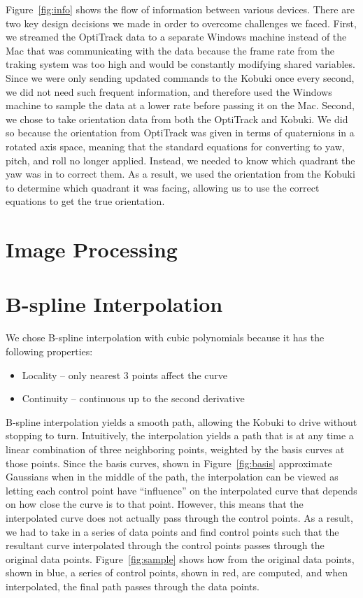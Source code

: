 \documentclass[10pt]{article}
\begin{document}
\begin{multicols}{2}
  Figure~\ref{fig:info} shows the flow of information between various devices.
  There are two key design decisions we made in order to overcome challenges we
  faced. First, we streamed the OptiTrack data to a separate Windows machine
  instead of the Mac that was communicating with the data because the frame rate
  from the traking system was too high and would be constantly modifying shared
  variables. Since we were only sending updated commands to the Kobuki once
  every second, we did not need such frequent information, and therefore used
  the Windows machine to sample the data at a lower rate before passing it on
  the Mac. Second, we chose to take orientation data from both the OptiTrack and
  Kobuki. We did so because the orientation from OptiTrack was given in terms of
  quaternions in a rotated axis space, meaning that the standard equations for
  converting to yaw, pitch, and roll no longer applied. Instead, we needed to
  know which quadrant the yaw was in to correct them. As a result, we used the
  orientation from the Kobuki to determine which quadrant it was facing,
  allowing us to use the correct equations to get the true orientation.

  \section*{Image Processing}

  \section*{B-spline Interpolation}
  We chose B-spline interpolation with cubic polynomials because it has the
  following properties: \cite{fuhuacheng2012}
  \begin{itemize}
    \item Locality -- only nearest 3 points affect the curve
    \item Continuity -- continuous up to the second derivative
  \end{itemize}
  B-spline interpolation yields a smooth path, allowing the Kobuki to drive
  without stopping to turn. Intuitively, the interpolation yields a path that is
  at any time a linear combination of three neighboring points, weighted by the
  basis curves at those points. Since the basis curves, shown in
  Figure~\ref{fig:basis} approximate Gaussians when in the middle of the path,
  the interpolation can be viewed as letting each control point have
  ``influence'' on the interpolated curve that depends on how close the curve is
  to that point. However, this means that the interpolated curve does not
  actually pass through the control points. As a result, we had to take in a
  series of data points and find control points such that the resultant curve
  interpolated through the control points passes through the original data
  points. Figure~\ref{fig:sample} shows how from the original data points, shown
  in blue, a series of control points, shown in red, are computed, and when
  interpolated, the final path passes through the data points.


\end{multicols}
\end{document}
